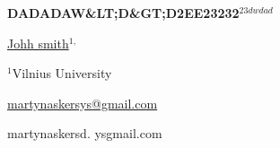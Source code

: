 \documentclass[12pt, twoside, a4paper, hidelinks]{article}
\begin{document}
    \begin{center} \MakeUppercase{ {\large \textbf{dadadaw&lt;D&gt;d2ee23232$^{23dwdad}$}}} \end{center}
    \vspace{-0.8cm}\begin{center} \underline{Johh smith}$^{1,}$ \end{center}
    \vspace{-.5cm}

    \begin{center} {\small $^{1}$Vilnius University
        
        \underline{martynaskersys@gmail.com}
    } \end{center}

    martynaskersd. ysgmail.com
    
\end{document}
